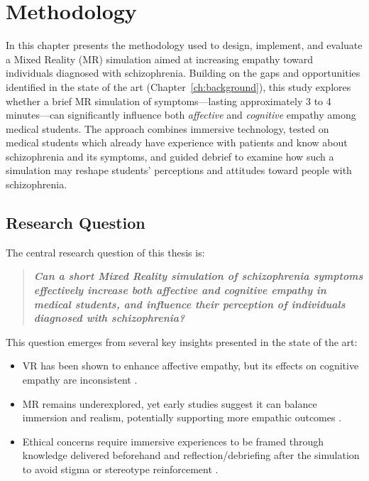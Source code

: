 \chapter{Methodology}
\label{ch:method}

In this chapter presents the methodology used to design, implement, and evaluate a Mixed Reality (MR) simulation aimed at increasing empathy toward individuals diagnosed with schizophrenia. Building on the gaps and opportunities identified in the state of the art (Chapter~\ref{ch:background}), this study explores whether a brief MR simulation of symptoms—lasting approximately 3 to 4 minutes—can significantly influence both \textit{affective} and \textit{cognitive} empathy among medical students. The approach combines immersive technology, tested on medical students which already have experience with patients and know about schizophrenia and its symptoms, and guided debrief to examine how such a simulation may reshape students' perceptions and attitudes toward people with schizophrenia.

\section{Research Question}

The central research question of this thesis is:

\begin{quote}
\textit{\textbf{Can a short Mixed Reality simulation of schizophrenia symptoms effectively increase both affective and cognitive empathy in medical students, and influence their perception of individuals diagnosed with schizophrenia?}}
\end{quote}

This question emerges from several key insights presented in the state of the art:

\begin{itemize}
    \item VR has been shown to enhance affective empathy, but its effects on cognitive empathy are inconsistent \cite{Martingano2021, Ventura2020}.
    \item MR remains underexplored, yet early studies suggest it can balance immersion and realism, potentially supporting more empathic outcomes \cite{Silva2017, Krogmeier2024}.
    \item Ethical concerns require immersive experiences to be framed through knowledge delivered beforehand and reflection/debriefing after the simulation to avoid stigma or stereotype reinforcement \cite{Rueda2020, Ando2011}.
\end{itemize}

